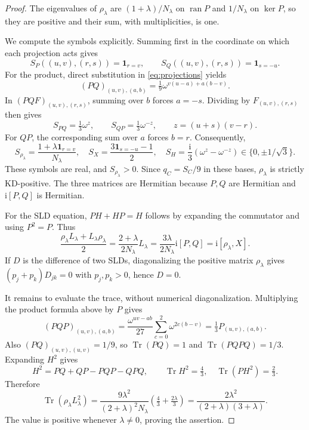 \documentclass[11pt]{article}
\newcommand{\Tr}{\operatorname{Tr}}
\newcommand{\ii}{\mathrm{i}}
\begin{document}
\begin{proof}
The eigenvalues of $\rho_\lambda$ are $(1+\lambda)/N_\lambda$ on
$\operatorname{ran}P$ and $1/N_\lambda$ on $\ker P$, so they are positive
and their sum, with multiplicities, is one.

We compute the symbols explicitly. Summing first in the coordinate on
which each projection acts gives
\begin{equation}\label{eq:symbols}
 S_P((u,v),(r,s))=\mathbf1_{r=v},\qquad
 S_Q((u,v),(r,s))=\mathbf1_{s=-u}.
\end{equation}
For the product, direct substitution in \eqref{eq:projections} yields
\[
 (PQ)_{(u,v),(a,b)}=\tfrac19\omega^{v(u-a)+a(b-v)}.
\]
In $(PQF)_{(u,v),(r,s)}$, summing over $b$ forces $a=-s$.
Dividing by $F_{(u,v),(r,s)}$ then gives
\begin{equation}\label{eq:product}
 S_{PQ}=\tfrac13\omega^z,\qquad S_{QP}=\tfrac13\omega^{-z},
 \qquad z=(u+s)(v-r).
\end{equation}
For $QP$, the corresponding sum over $a$ forces $b=r$.
Consequently,
\[
 S_{\rho_\lambda}=\frac{1+\lambda\mathbf1_{r=v}}{N_\lambda},\quad
 S_X=\frac{3\mathbf1_{s=-u}-1}{2},\quad
 S_H=\frac{\ii}{3}(\omega^z-\omega^{-z})\in\{0,\pm1/\sqrt3\}.
\]
These symbols are real, and $S_{\rho_\lambda}>0$. Since
$q_C=S_C/9$ in these bases, $\rho_\lambda$ is strictly KD-positive.
The three matrices are Hermitian because $P,Q$ are Hermitian and
$\ii[P,Q]$ is Hermitian.

For the SLD equation, $PH+HP=H$ follows by expanding the commutator and
using $P^2=P$. Thus
\[
 \frac{\rho_\lambda L_\lambda+L_\lambda\rho_\lambda}{2}
 =\frac{2+\lambda}{2N_\lambda}L_\lambda
 =\frac{3\lambda}{2N_\lambda}\ii[P,Q]
 =\ii[\rho_\lambda,X].
\]
If $D$ is the difference of two SLDs, diagonalizing the positive matrix
$\rho_\lambda$ gives $(p_j+p_k)D_{jk}=0$ with $p_j,p_k>0$, hence $D=0$.

It remains to evaluate the trace, without numerical diagonalization.
Multiplying the product formula above by $P$ gives
\[
 (PQP)_{(u,v),(a,b)}
 =\frac{\omega^{uv-ab}}{27}\sum_{c=0}^2\omega^{2c(b-v)}
 =\tfrac13P_{(u,v),(a,b)}.
\]
Also $(PQ)_{(u,v),(u,v)}=1/9$, so $\Tr(PQ)=1$ and
$\Tr(PQPQ)=1/3$. Expanding $H^2$ gives
\[
 H^2=PQ+QP-PQP-QPQ,\qquad
 \Tr H^2=\tfrac43,\quad \Tr(PH^2)=\tfrac23.
\]
Therefore
\[
 \Tr(\rho_\lambda L_\lambda^2)
 =\frac{9\lambda^2}{(2+\lambda)^2N_\lambda}
       \left(\tfrac43+\tfrac{2\lambda}{3}\right)
 =\frac{2\lambda^2}{(2+\lambda)(3+\lambda)}.
\]
The value is positive whenever $\lambda\ne0$, proving the assertion.
\end{proof}
\end{document}
